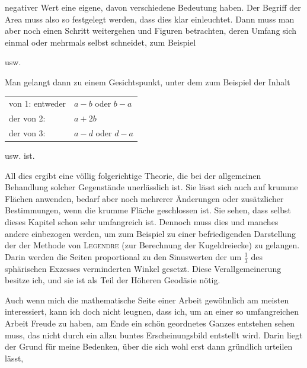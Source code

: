 %
negativer Wert eine eigene, davon verschiedene Bedeutung haben. Der Begriff der Area muss also so festgelegt werden, dass dies klar einleuchtet. Dann muss man aber noch einen Schritt weitergehen und Figuren betrachten, deren Umfang sich einmal oder mehrmals selbst schneidet, zum Beispiel
\begin{center}
\quad\quad\quad usw.
\end{center}
\noindent Man gelangt dann zu einem Gesichtspunkt, unter dem zum Beispiel der Inhalt
\begin{center}\begin{tabular}{ll}
von 1: entweder &$a-b$ oder $b-a$\\
der von 2: &$a+2b$\\
der von 3: &$a-d$ oder $d-a$
\end{tabular}\end{center}
\noindent usw. ist.

All dies ergibt eine völlig folgerichtige Theorie, die bei der allgemeinen Behandlung solcher Gegenstände unerlässlich ist. Sie lässt sich auch auf krumme Flächen anwenden, bedarf aber noch mehrerer Änderungen oder zusätzlicher Bestimmungen, wenn die krumme Fläche geschlossen ist. Sie sehen, dass selbst dieses Kapitel schon sehr umfangreich ist. Dennoch muss dies und manches andere einbezogen werden, um zum Beispiel zu einer befriedigenden Darstellung der  der Methode von \textsc{Legendre} (zur Berechnung der Kugeldreiecke) zu gelangen. Darin werden die Seiten proportional zu den Sinuswerten der um $\frac13$ des sphärischen Exzesses verminderten Winkel gesetzt. Diese Verallgemeinerung besitze ich, und sie ist als Teil der Höheren Geodäsie nötig.

Auch wenn mich die mathematische Seite einer Arbeit gewöhnlich am meisten interessiert, kann ich doch nicht leugnen, dass ich, um an einer so umfangreichen Arbeit Freude zu haben, am Ende ein schön geordnetes Ganzes entstehen sehen muss, das nicht durch ein allzu buntes Erscheinungsbild entstellt wird. Darin liegt der Grund für meine Bedenken, über die sich wohl erst dann gründlich urteilen lässt,
